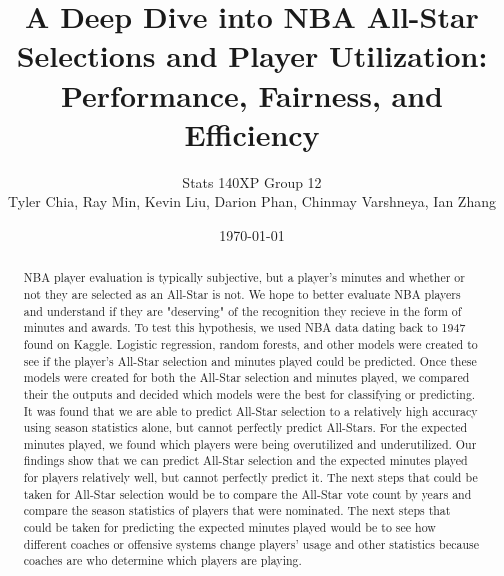 \documentclass[12pt]{article}
\title{A Deep Dive into NBA All-Star Selections and Player Utilization: Performance, Fairness, and Efficiency}
\author{Stats 140XP Group 12 \\ Tyler Chia, Ray Min, Kevin Liu, Darion Phan, Chinmay Varshneya, Ian Zhang}
\date{\today}
\begin{document}
\maketitle

\begin{abstract}
NBA player evaluation is typically subjective, but a player's minutes and whether or not they are selected as an All-Star is not. We hope to better evaluate NBA players and understand if they are "deserving" of the recognition they recieve in the form of minutes and awards. To test this hypothesis, we used NBA data dating back to 1947 found on Kaggle. Logistic regression, random forests, and other models were created to see if the player's All-Star selection and minutes played could be predicted. Once these models were created for both the All-Star selection and minutes played, we compared their the outputs and decided which models were the best for classifying or predicting. It was found that we are able to predict All-Star selection to a relatively high accuracy using season statistics alone, but cannot perfectly predict All-Stars. For the expected minutes played, we found which players were being overutilized and underutilized. Our findings show that we can predict All-Star selection and the expected minutes played for players relatively well, but cannot perfectly predict it. The next steps that could be taken for All-Star selection would be to compare the All-Star vote count by years and compare the season statistics of players that were nominated. The next steps that could be taken for predicting the expected minutes played would be to see how different coaches or offensive systems change players' usage and other statistics because coaches are who determine which players are playing.
\end{abstract}
\end{document}
